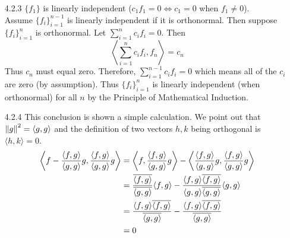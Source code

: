 \documentclass[../../Solutions.tex]{subfiles}
\begin{document}
\begin{itemize}
	\item [4.2.3] $\{f_1\}$ is linearly independent ($c_1f_1 = 0 \iff c_1 = 0$ when $f_1 \neq 0$). \\
		Assume $\{f_i\}_{i=1}^{n-1}$ is linearly independent if it is orthonormal.
		Then suppose $\{f_i\}_{i=1}^n$ is orthonormal.
		Let $\sum_{i=1}^n c_if_i = 0$. Then
		$$ \left\langle \sum_{i=1}^n c_i f_i , f_n \right\rangle = c_n $$
		Thus $c_n$ must equal zero.
		Therefore, $\sum_{i=1}^{n-1} c_if_i = 0$ which means all of the $c_i$ are zero (by assumption).
		Thus $\{f_i\}_{i=1}^n$ is linearly independent (when orthonormal) for all $n$ by the Principle of Mathematical Induction.
	
	\item [4.2.4] This conclusion is shown a simple calculation.
		We point out that $\left\lVert g\right\rVert^2 = \langle g,g \rangle$ and the definition of two vectors $h,k$ being orthogonal is $\langle h,k \rangle = 0$.
		\begin{equation*} \begin{split}
			\left\langle f-\frac{\langle f,g \rangle}{\langle g,g \rangle}g , \frac{\langle f,g \rangle}{\langle g,g \rangle}g \right\rangle
				&= \left\langle f, \frac{\langle f,g \rangle}{\langle g,g \rangle}g \right\rangle - \left\langle \frac{\langle f,g \rangle}{\langle g,g \rangle}g,\frac{\langle f,g \rangle}{\langle g,g \rangle}g \right\rangle \\
				&= \frac{\overline{\langle f,g \rangle}}{\overline{\langle g,g \rangle}} \langle f,g \rangle - \frac{\langle f,g \rangle \overline{\langle f,g \rangle}}{\langle g,g \rangle \overline{\langle g,g \rangle}}\langle g,g \rangle \\
				&= \frac{\langle f,g \rangle \overline{\langle f,g \rangle}}{\overline{\langle g,g \rangle}} - \frac{\langle f,g \rangle \overline{\langle f,g \rangle}}{\overline{\langle g,g \rangle}} \\
				&= 0
		\end{split} \end{equation*}
	

\end{itemize}
\end{document}

